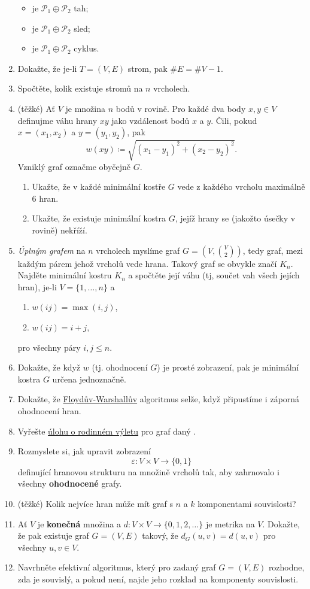 \begin{enumerate}
\begin{itemize}
   \item je $\mathcal{P}_1 \oplus \mathcal{P}_2$ tah;
   \item je $\mathcal{P}_1 \oplus \mathcal{P}_2$ sled;
   \item je $\mathcal{P}_1 \oplus \mathcal{P}_2$ cyklus.
  \end{itemize}
 \item Dokažte, že je-li $T = (V,E)$ strom, pak $\# E = \# V - 1$.
 \item Spočtěte, kolik existuje stromů na $n$ vrcholech.
 \item (těžké) Ať $V$ je množina $n$ bodů v rovině. Pro každé dva body $x,y \in
  V$ definujme váhu hrany $xy$ jako vzdálenost bodů $x$ a $y$. Čili, pokud $x =
  (x_1,x_2)$ a $y = (y_1,y_2)$, pak
  \[
   w(xy) \coloneqq \sqrt{(x_1 - y_1)^2 + (x_2 - y_2)^2}.
  \]
  Vzniklý graf označme obyčejně $G$.
  \begin{enumerate}[label=(\alph*)]
   \item Ukažte, že v každé minimální kostře $G$ vede z každého vrcholu maximálně
    6 hran.
   \item Ukažte, že existuje minimální kostra $G$, jejíž hrany se (jakožto úsečky
    v rovině) nekříží.
  \end{enumerate}
 \item \emph{Úplným grafem} na $n$ vrcholech myslíme graf $G = (V,
  \binom{V}{2})$, tedy graf, mezi každým párem jehož vrcholů vede hrana. Takový
  graf se obvykle značí $K_n$. Najděte minimální kostru $K_n$ a spočtěte její
  váhu (tj, součet vah všech jejích hran), je-li $V = \{1,\ldots,n\}$ a
  \begin{enumerate}[label=(\alph*)]
   \item $w(ij) = \max(i,j)$,
   \item $w(ij) = i + j$,
  \end{enumerate}
  pro všechny páry $i,j \leq n$.
 \item Dokažte, že když $w$ (tj. ohodnocení $G$) je prosté zobrazení, pak je
  minimální kostra $G$ určena jednoznačně.
 \item Dokažte, že \hyperref[alg:floyd-warshall]{Floydův-Warshallův} algoritmus
  selže, když připustíme i záporná ohodnocení hran.
 \item Vyřešte \hyperref[prob:rodinny-vylet]{úlohu o rodinném výletu} pro graf
  daný .
 \item Rozmyslete si, jak upravit zobrazení
  \[
   \varepsilon:V \times V \to \{0,1\}
  \]
  definující hranovou strukturu na množině vrcholů tak, aby zahrnovalo i všechny
  \textbf{ohodnocené} grafy.
 \item (těžké) Kolik nejvíce hran může mít graf s $n$ a $k$ komponentami
  souvislosti?
 \item Ať $V$ je \textbf{konečná} množina a $d:V \times V \to \{0,1,2,\ldots\}$
  je metrika na $V$. Dokažte, že pak existuje graf $G = (V,E)$ takový, že
  $d_G(u,v) = d(u,v)$ pro všechny $u,v \in V$.
 \item Navrhněte efektivní algoritmus, který pro zadaný graf $G = (V,E)$
  rozhodne, zda je souvislý, a pokud není, najde jeho rozklad na komponenty
  souvislosti.
\end{enumerate}

